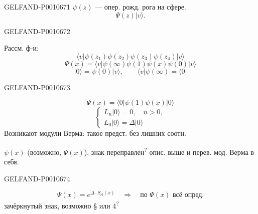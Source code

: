 \begin{GelfandAdjacentEvidence}{GELFAND-P001067}{1}
$\psi(z)$ — опер. рожд. рога на сфере.
\begin{equation*}
\Psi(z)|v\rangle.
\end{equation*}
\end{GelfandAdjacentEvidence}
\begin{GelfandAdjacentEvidence}{GELFAND-P001067}{2}

Рассм. ф-и:
\begin{equation*}
\langle v|\psi(z_1)\psi(z_2)\psi(z_3)\psi(z_4)|v\rangle
\tag{23}
\end{equation*}
\begin{equation*}
\Psi(x)=\langle v|\psi(\infty)\psi(1)\psi(x)\psi(0)|v\rangle
\end{equation*}
\begin{equation*}
|0\rangle=\psi(0)|v\rangle,\qquad \langle v|\psi(\infty)=\langle0|
\end{equation*}
\end{GelfandAdjacentEvidence}
\begin{GelfandAdjacentEvidence}{GELFAND-P001067}{3}

\begin{equation*}
\Psi(x)=\langle0|\psi(1)\psi(x)|0\rangle
\end{equation*}
\begin{equation*}
\begin{cases}
L_n|0\rangle=0,\quad n>0,\\
L_0|0\rangle=\Delta|0\rangle
\end{cases}
\tag{24}
\end{equation*}
Возникают модули Верма: такое предст. без лишних соотн.

$\psi(x)$ (возможно, $\Psi(x)$), знак переправлен\textsuperscript{?} опис. выше и перев. мод. Верма в себя.
\end{GelfandAdjacentEvidence}
\begin{GelfandAdjacentEvidence}{GELFAND-P001067}{4}

\begin{equation*}
\Psi(x)=e^{\Delta\cdot S_{cl}(x)}\quad\Rightarrow\quad\text{по \(\Psi(x)\) всё опред.}
\tag{25}
\end{equation*}
зачёркнутый знак, возможно § или 4\textsuperscript{?}\ 
\end{GelfandAdjacentEvidence}
